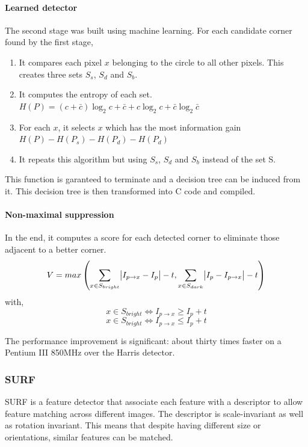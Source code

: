 \documentclass[12pt]{article}
\begin{document}
\paragraph{Learned detector}
The second stage was built using machine learning. For each candidate corner found by the first stage, 

\begin{enumerate}
	\item It compares each pixel $x$ belonging to the circle to all other pixels. This creates three sets $S_s$, $S_d$ and $S_b$.
	\item It computes the entropy of each set. $H(P) = (c + \bar{c})\log_2{c + \bar{c}} + c\log_2{c} + \bar{c}\log_2{\bar{c}}$
	\item For each $x$, it selects $x$ which has the most information gain $H(P) - H(P_s) - H(P_d) - H(P_d)$
	\item It repeats this algorithm but using $S_s$, $S_d$ and $S_b$ instead of the set S.
\end{enumerate}

This function is garanteed to terminate and a decision tree can be induced from it. This decision tree is then transformed into C code and compiled.

\paragraph{Non-maximal suppression}
In the end, it computes a score for each detected corner to eliminate those adjacent to a better corner.
\[
V = max \left(\sum_{x \in S_{bright}}{\abs{I_{p \rightarrow x} - I_p} - t},  \sum_{x \in S_{dark}}{\abs{I_p - I_{p \rightarrow x}} - t} \right)
\]
with,
\[
	x \in S_{bright} \Leftrightarrow  I_{p \rightarrow x} \geq I_p + t
\]
\[
	x \in S_{bright} \Leftrightarrow  I_{p \rightarrow x} \leq I_p + t
\]

The performance improvement is significant: about thirty times faster on a Pentium III 850MHz over the Harris detector.

\subsubsection{SURF}

SURF\cite{Surf06} is a feature detector that associate each feature with a descriptor to allow feature matching across different images. The descriptor is scale-invariant as well as rotation invariant. This means that despite having different size or orientations, similar features can be matched.
\end{document}
